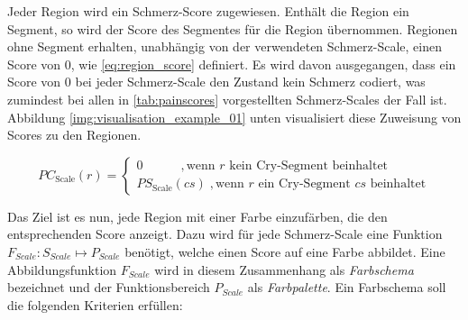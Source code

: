 Jeder Region wird ein Schmerz-Score zugewiesen. Enthält die Region ein Segment, so wird der Score des Segmentes für die Region übernommen. Regionen ohne Segment erhalten, unabhängig von der verwendeten Schmerz-Scale, einen Score von 0, wie \autoref{eq:region_score} definiert. Es wird davon ausgegangen, dass ein Score von 0 bei jeder Schmerz-Scale den Zustand \glqq kein Schmerz\grqq{} codiert, was zumindest bei allen in \autoref{tab:painscores} vorgestellten Schmerz-Scales der Fall ist. Abbildung \ref{img:visualisation_example_01} unten visualisiert diese Zuweisung von Scores zu den Regionen.

\begin{equation}
PC_{\text{Scale}}(r) = \begin{cases}
 0 \quad \quad \quad,  \text{wenn } r  \text{ kein Cry-Segment beinhaltet} \\
 PS_{\text{Scale}}(cs) \;, \text{wenn } r  \text{ ein Cry-Segment } cs \text{ beinhaltet}
 \end{cases}	
 \label{eq:region_score}
\end{equation}

Das Ziel ist es nun, jede Region mit einer Farbe einzufärben, die den entsprechenden Score anzeigt. Dazu wird für jede Schmerz-Scale eine Funktion $F_{Scale}:S_{Scale} \mapsto P_{Scale}$ benötigt, welche einen Score auf eine Farbe abbildet. Eine Abbildungsfunktion $F_{Scale}$ wird in diesem Zusammenhang als \emph{Farbschema} bezeichnet und der Funktionsbereich $P_{Scale}$ als \emph{Farbpalette}. Ein Farbschema soll die folgenden Kriterien erfüllen:

